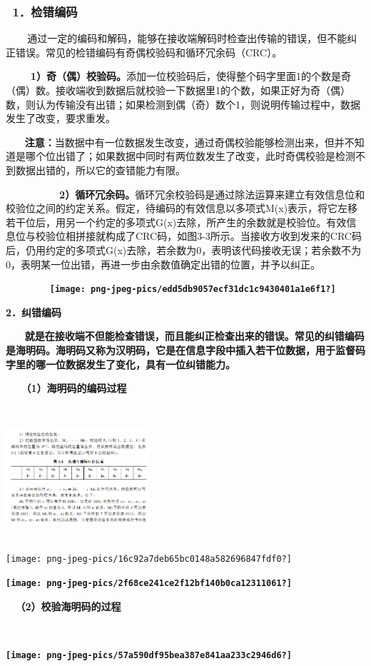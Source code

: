 \subsubsection{\texorpdfstring{\textbf{~1．检错编码}}{~1．检错编码}}\label{ux68c0ux9519ux7f16ux7801}

~ ~
~通过一定的编码和解码，能够在接收端解码时检查出传输的错误，但不能纠正错误。常见的检错编码有奇偶校验码和循环冗余码（CRC）。\emph{}

\textbf{~ ~
~1）奇（偶）校验码。}添加一位校验码后，使得整个码字里面1的个数是奇（偶）数。接收端收到数据后就校验一下数据里1的个数，如果正好为奇（偶）数，则认为传输没有出错；如果检测到偶（奇）数个1，则说明传输过程中，数据发生了改变，要求重发。

\textbf{~ ~
注意：}当数据中有一位数据发生改变，通过奇偶校验能够检测出来，但并不知道是哪个位出错了；如果数据中同时有两位数发生了改变，此时奇偶校验是检测不到数据出错的，所以它的查错能力有限。\textbf{}

\textbf{~ ~ ~ ~ ~
~2）循环冗余码。}循环冗余校验码是通过除法运算来建立有效信息位和校验位之间的约定关系。假定，待编码的有效信息以多项式M(x)表示，将它左移若干位后，用另一个约定的多项式G(x)去除，所产生的余数就是校验位。有效信息位与校验位相拼接就构成了CRC码，如图3-3所示。当接收方收到发来的CRC码后，仍用约定的多项式G(x)去除，若余数为0，表明该代码接收无误；若余数不为0，表明某一位出错，再进一步由余数值确定出错的位置，并予以纠正。

\textbf{~~~~~~~
\texttt{[image: png-jpeg-pics/edd5db9057ecf31dc1c9430401a1e6f1?]}}

\textbf{}

\textbf{\textbf{2．纠错编码}}

\textbf{~ ~
就是在接收端不但能检查错误，而且能纠正检查出来的错误。常见的纠错编码是海明码。海明码又称为汉明码，它是在信息字段中插入若干位数据，用于监督码字里的哪一位数据发生了变化，\textbf{具有一位纠错能力}。}

\textbf{\textbf{~ ~（1）海明码的编码过程}}

\textbf{\includegraphics[width=2.08333in,height=2.08333in]{png-jpeg-pics/780c02e6761c557a1ad61d7a253175f6?}\\
\hspace*{0.333em}}{}
\texttt{[image: png-jpeg-pics/16c92a7deb65bc0148a582696847fdf0?]}\textbf{\\
\hspace*{0.333em}}

\textbf{\texttt{[image: png-jpeg-pics/2f68ce241ce2f12bf140b0ca12311061?]}}

\textbf{}

\textbf{\textbf{~ （2）校验海明码的过程}}

\textbf{\\
}{}

\textbf{\texttt{[image: png-jpeg-pics/57a590df95bea387e841aa233c2946d6?]}}
